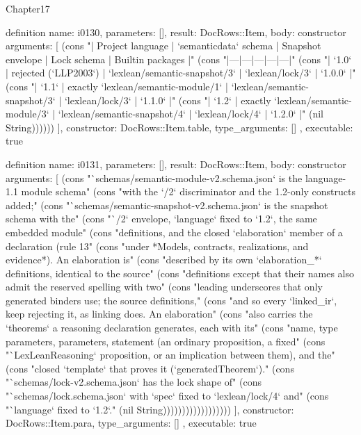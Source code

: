 \begin{lexlean}{Chapter17}
\begin{semanticmodule}
definition{
  name: i0130,
  parameters: [],
  result: DocRows::Item,
  body: constructor{
    arguments: [
      (cons "| Project language | `semanticdata` schema | Snapshot envelope | Lock schema | Builtin packages |" (cons "|---|---|---|---|---|" (cons "| `1.0` | rejected (`LLP2003`) | `lexlean/semantic-snapshot/3` | `lexlean/lock/3` | `1.0.0` |" (cons "| `1.1` | exactly `lexlean/semantic-module/1` | `lexlean/semantic-snapshot/3` | `lexlean/lock/3` | `1.1.0` |" (cons "| `1.2` | exactly `lexlean/semantic-module/3` | `lexlean/semantic-snapshot/4` | `lexlean/lock/4` | `1.2.0` |" (nil String))))))
    ],
    constructor: DocRows::Item.table,
    type_arguments: []
  },
  executable: true
}

definition{
  name: i0131,
  parameters: [],
  result: DocRows::Item,
  body: constructor{
    arguments: [
      (cons "`schemas/semantic-module-v2.schema.json` is the language-1.1 module schema" (cons "with the `/2` discriminator and the 1.2-only constructs added;" (cons "`schemas/semantic-snapshot-v2.schema.json` is the snapshot schema with the" (cons "`/2` envelope, `language` fixed to `1.2`, the same embedded module" (cons "definitions, and the closed `elaboration` member of a declaration (rule 13" (cons "under *Models, contracts, realizations, and evidence*). An elaboration is" (cons "described by its own `elaboration_*` definitions, identical to the source" (cons "definitions except that their names also admit the reserved spelling with two" (cons "leading underscores that only generated binders use; the source definitions," (cons "and so every `linked_ir`, keep rejecting it, as linking does. An elaboration" (cons "also carries the `theorems` a reasoning declaration generates, each with its" (cons "name, type parameters, parameters, statement (an ordinary proposition, a fixed" (cons "`LexLeanReasoning` proposition, or an implication between them), and the" (cons "closed `template` that proves it (`generatedTheorem`)." (cons "`schemas/lock-v2.schema.json` has the lock shape of" (cons "`schemas/lock.schema.json` with `spec` fixed to `lexlean/lock/4` and" (cons "`language` fixed to `1.2`." (nil String))))))))))))))))))
    ],
    constructor: DocRows::Item.para,
    type_arguments: []
  },
  executable: true
}


\end{semanticmodule}
\end{lexlean}
